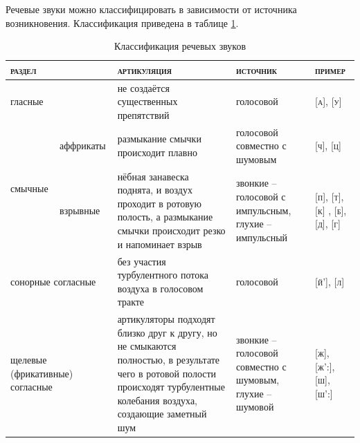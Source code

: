 Речевые звуки можно классифицировать в зависимости от источника возникновения. Классификация приведена в таблице \ref{tab:sounds}.


\begin{table}[H]
	\caption{Классификация речевых звуков}
	\label{tab:sounds}
	\begin{tabular}{|p{}p{}|p{}|p{}|p{}|}
		\hline
		\multicolumn{2}{|p{0.1\textwidth}|}{\textsc{раздел}} & \textsc{артикуляция} & \textsc{источник} & \textsc{пример} \\ \hline \hline
		\multicolumn{2}{|p{0.1\textwidth}|}{гласные} & не создаётся существенных препятствий & голосовой & \textsc{{[}а{]}, {[}у{]}} \\ \hline
		\multicolumn{1}{|p{0.08\textwidth}|}{\multirow{2}{*}{смычные}}& аффрикаты & размыкание смычки происходит плавно & голосовой совместно с шумовым & \textsc{{[}ч{]}, {[}ц{]}} \\ \cline{2-5} 
		\multicolumn{1}{|p{0.15\textwidth}|}{согласные} & взрывные & нёбная занавеска поднята, и воздух проходит в ротовую полость, а размыкание смычки происходит резко и напоминает взрыв & звонкие -- голосовой с импульсным, глухие -- импульсный & \textsc{{[}п{]}, {[}т{]}, {[}к{]} , {[}б{]}, {[}д{]}, {[}г{]}} \\ \hline
		\multicolumn{2}{|p{0.3\textwidth}|}{сонорные согласные} & без участия турбулентного потока воздуха в голосовом тракте & голосовой & \textsc{{[}й’{]}, {[}л{]}} \\ \hline
		\multicolumn{2}{|p{0.2\textwidth}|}{щелевые (фрикативные) согласные} & артикуляторы подходят близко друг к другу, но не смыкаются полностью, в результате чего в ротовой полости происходят турбулентные колебания воздуха, создающие заметный шум & звонкие -- голосовой совместно с шумовым, глухие -- шумовой & \textsc{{[}ж{]}, {[}ж':{]}, {[}ш{]}, {[}ш':{]}} \\ \hline
	\end{tabular}
\end{table}


